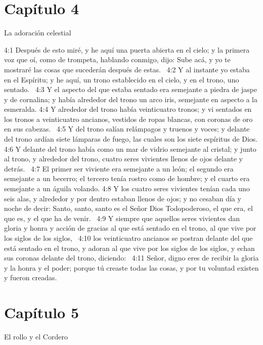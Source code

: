 \section*{Capítulo 4}
La adoración celestial  

4:1 Después de esto miré, y he aquí una puerta abierta en el cielo; y la primera voz que oí, como de trompeta, hablando conmigo, dijo: Sube acá, y yo te mostraré las cosas que sucederán después de estas.  
4:2 Y al instante yo estaba en el Espíritu; y he aquí, un trono establecido en el cielo, y en el trono, uno sentado.  
4:3 Y el aspecto del que estaba sentado era semejante a piedra de jaspe y de cornalina; y había alrededor del trono un arco iris, semejante en aspecto a la esmeralda. 
4:4 Y alrededor del trono había veinticuatro tronos; y vi sentados en los tronos a veinticuatro ancianos, vestidos de ropas blancas, con coronas de oro en sus cabezas.  
4:5 Y del trono salían relámpagos y truenos y voces; y delante del trono ardían siete lámparas de fuego, las cuales son los siete espíritus de Dios. 
4:6 Y delante del trono había como un mar de vidrio semejante al cristal; y junto al trono, y alrededor del trono, cuatro seres vivientes llenos de ojos delante y detrás.  
4:7 El primer ser viviente era semejante a un león; el segundo era semejante a un becerro; el tercero tenía rostro como de hombre; y el cuarto era semejante a un águila volando. 
4:8 Y los cuatro seres vivientes tenían cada uno seis alas, y alrededor y por dentro estaban llenos de ojos; y no cesaban día y noche de decir: Santo, santo, santo es el Señor Dios Todopoderoso, el que era, el que es, y el que ha de venir.  
4:9 Y siempre que aquellos seres vivientes dan gloria y honra y acción de gracias al que está sentado en el trono, al que vive por los siglos de los siglos,  
4:10 los veinticuatro ancianos se postran delante del que está sentado en el trono, y adoran al que vive por los siglos de los siglos, y echan sus coronas delante del trono, diciendo:  
4:11 Señor, digno eres de recibir la gloria y la honra y el poder; porque tú creaste todas las cosas, y por tu voluntad existen y fueron creadas.  
\section*{Capítulo 5 }
El rollo y el Cordero  

